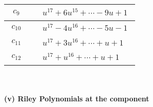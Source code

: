\documentclass[1p]{elsarticle_modified}
\theoremstyle{definition}
\begin{document}
\begin{tabular}{m{50pt}|m{274pt}}
\hline $$\begin{aligned}c_{9}\end{aligned}$$&$\begin{aligned}
&u^{17}+6 u^{15}+\cdots-9 u+1
\end{aligned}$\\
\hline $$\begin{aligned}c_{10}\end{aligned}$$&$\begin{aligned}
&u^{17}-4 u^{16}+\cdots-5 u-1
\end{aligned}$\\
\hline $$\begin{aligned}c_{11}\end{aligned}$$&$\begin{aligned}
&u^{17}+3 u^{16}+\cdots+u+1
\end{aligned}$\\
\hline $$\begin{aligned}c_{12}\end{aligned}$$&$\begin{aligned}
&u^{17}+u^{16}+\cdots+u+1
\end{aligned}$\\
\hline
\end{tabular}\\~\\
\newpage\renewcommand{\arraystretch}{1}
\flushleft \textbf{(v) Riley Polynomials at the component}\newline \\
\end{document}
